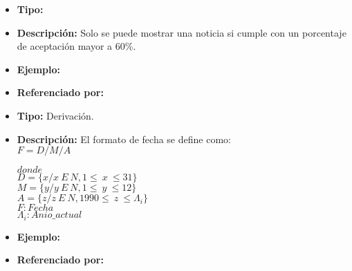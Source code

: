 \begin{itemize}
  \item \textbf{Tipo:}  
  \item \textbf{Descripción:} Solo se puede mostrar una noticia si cumple con un porcentaje de aceptación mayor a 60\%.
  \item \textbf{Ejemplo:}
  \item \textbf{Referenciado por:}  \\
\end{itemize}

\begin{itemize}
  \item \textbf{Tipo:} Derivación.
  \item \textbf{Descripción:} El formato de fecha se define como:\\

  $F=D/M/A$

  $donde$\\ 

  $D=\{x/x\ E\ N,1\leq\ x\ \leq31\}$\\
  $M=\{y/y\ E\ N,1\leq\ y\ \leq12\}$\\
  $A=\{z/z\ E\ N,1990\leq\ z\ \leq\Lambda_i\}$\\

  $F:Fecha$\\
  $\Lambda_i:Anio\_actual$\\

  \item \textbf{Ejemplo:} 
  \item \textbf{Referenciado por:}  \\
\end{itemize}


